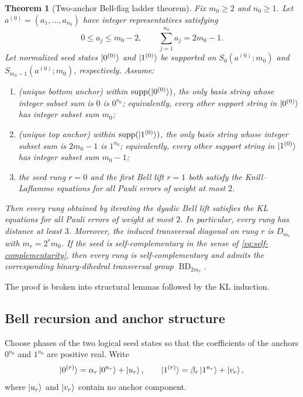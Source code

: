\documentclass[11pt]{article}
\newcommand{\supp}{\operatorname{supp}}
\newcommand{\BD}{\operatorname{BD}}
\newtheorem{theorem}{Theorem}[section]
\begin{document}
\begin{theorem}[Two-anchor Bell-flag ladder theorem]
\label{thm:two-anchor-bell}
Fix $m_0\ge2$ and $n_0\ge1$.  Let
$a^{(0)}=(a_1,\ldots,a_{n_0})$ have integer representatives satisfying
\begin{equation}
  0\le a_j\le m_0-2,
  \qquad
  \sum_{j=1}^{n_0}a_j=2m_0-1.
  \label{eq:theorem-angle-hypotheses}
\end{equation}
Let normalized seed states $\ket{0^{(0)}}$ and $\ket{1^{(0)}}$ be supported on
$S_0(a^{(0)};m_0)$ and $S_{m_0-1}(a^{(0)};m_0)$, respectively.  Assume:
\begin{enumerate}[label=\textup{(\roman*)}]
\item \textup{(unique bottom anchor)} within $\supp(\ket{0^{(0)}})$, the only basis string whose
integer subset sum is $0$ is $0^{n_0}$; equivalently, every other support string in
$\ket{0^{(0)}}$ has integer subset sum $m_0$;
\item \textup{(unique top anchor)} within $\supp(\ket{1^{(0)}})$, the only basis string whose
integer subset sum is $2m_0-1$ is $1^{n_0}$; equivalently, every other support string in
$\ket{1^{(0)}}$ has integer subset sum $m_0-1$;
\item the seed rung $r=0$ and the first Bell lift $r=1$ both satisfy the Knill--Laflamme
equations for all Pauli errors of weight at most $2$.
\end{enumerate}
Then every rung obtained by iterating the dyadic Bell lift satisfies the KL equations for all
Pauli errors of weight at most $2$.  In particular, every rung has distance at least $3$.
Moreover, the induced transversal diagonal on rung $r$ is $D_{m_r}$ with $m_r=2^r m_0$.  If the
seed is self-complementary in the sense of \eqref{eq:self-complementarity}, then every rung is
self-complementary and admits the corresponding binary-dihedral transversal group $\BD_{2m_r}$.
\end{theorem}

The proof is broken into structural lemmas followed by the KL induction.

\subsection{Bell recursion and anchor structure}

Choose phases of the two logical seed states so that the coefficients of the anchors
$0^{n_0}$ and $1^{n_0}$ are positive real.  Write
\begin{equation}
  \ket{0^{(r)}}=\alpha_r\ket{0^{n_r}}+\ket{u_r},
  \qquad
  \ket{1^{(r)}}=\beta_r\ket{1^{n_r}}+\ket{v_r},
  \label{eq:anchor-decomposition}
\end{equation}
where $\ket{u_r}$ and $\ket{v_r}$ contain no anchor component.
\end{document}
